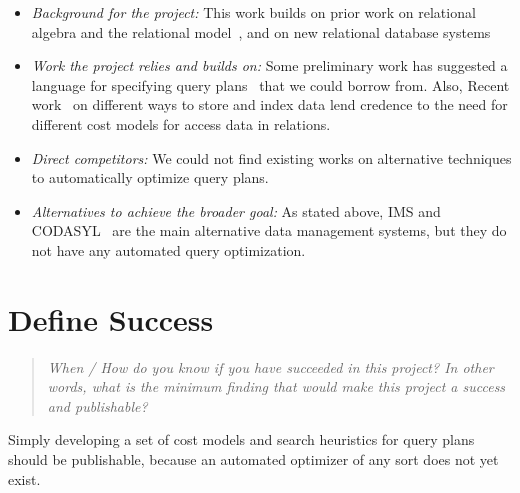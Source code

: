 \documentclass[10pt, sigconf]{acmart}
\begin{document}
\begin{itemize}
\item \emph{Background for the project:} This work builds on prior work on relational algebra and the relational model~\cite{codd1970relational}, and on new relational database systems~\cite{stonebraker1976design,astrahan1976system}

\item \emph{Work the project relies and builds on: } Some preliminary work has suggested a language for specifying query plans~\cite{lorie1979access} that we could borrow from.  Also, Recent work~\cite{bayer2002organization} on different ways to store and index data lend credence to the need for different cost models for access data in relations.

\item \emph{Direct competitors: } We could not find existing works on alternative techniques to automatically optimize query plans.

\item \emph{Alternatives to achieve the broader goal: } As stated above, IMS and CODASYL~\cite{taylor1976codasyl} are the main alternative data management systems, but they do not have any automated query optimization.

 \end{itemize}


\section{Define Success}
\begin{quote}
\emph{When / How do you know if you have succeeded in this project?
In other words, what is the minimum finding that would make this project a success and publishable?}
\end{quote}

Simply developing a set of cost models and search heuristics for query plans should be publishable, because an automated optimizer of any sort does not yet exist.  



\end{document}
